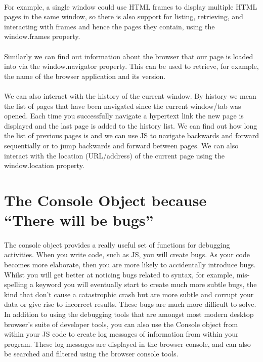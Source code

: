 \paragraph{} For example, a single window could use HTML frames to display multiple HTML pages in the same window, so there is also support for listing, retrieving, and interacting with frames and hence the pages they contain, using the window.frames property.
\paragraph{} Similarly we can find out information about the browser that our page is loaded into via the window.navigator property. This can be used to retrieve, for example, the name of the browser application and its version.
\paragraph{} We can also interact with the history of the current window. By history we mean the list of pages that have been navigated since the current window/tab was opened. Each time you successfully navigate a hypertext link the new page is displayed and the last page is added to the history list. We can find out how long the list of previous pages is and we can use JS to navigate backwards and forward sequentially or to jump backwards and forward between pages. We can also interact with the location (URL/address) of the current page using the window.location property.


\section{The Console Object because ``There will be bugs''}
\paragraph{} The console object provides a really useful set of functions for debugging activities. When you write code, such as JS, you will create bugs. As your code becomes more elaborate, then you are more likely to accidentally introduce bugs. Whilst you will get better at noticing bugs related to syntax, for example, mis-spelling a keyword you will eventually start to create much more subtle bugs, the kind that don't cause a catastrophic crash but are more subtle and corrupt your data or give rise to incorrect results. These bugs are much more difficult to solve. In addition to using the debugging tools that are amongst most  modern desktop browser's suite of developer tools, you can also use the Console object from within your JS code to create log messages of information from within your program. These log messages are displayed in the browser console, and can also be searched and filtered using the browser console tools.

